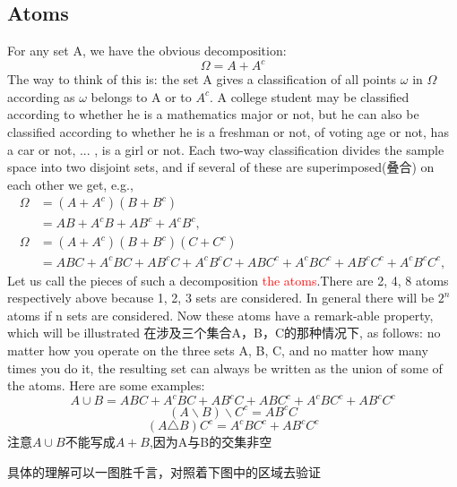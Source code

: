 \documentclass[12pt]{book}
\theoremstyle{definition}\newtheorem{dfn}{Définition}[chapter]
\theoremstyle{plain}\newtheorem{thm}{Théorème}[chapter]
\theoremstyle{plain}\newtheorem{prp}{Proposition}[chapter]
\theoremstyle{plain}\newtheorem{lem}{\bf Lemme}[chapter]
\theoremstyle{plain}\newtheorem{axm}{\bf Axiome}[chapter]
\theoremstyle{plain}\newtheorem{lmm}{\bf Lemme}[chapter]
\theoremstyle{plain}\newtheorem{exm}{\bf Example}[chapter]
\theoremstyle{plain}\newtheorem{cor}{\bf Corollaire}[chapter]
\theoremstyle{remark}\newtheorem{rem}{Remarque}[chapter]
\begin{document}
\subsection{Atoms}
For any set A, we have the obvious decomposition:
\begin{equation*}
\Omega=A+A^c
\end{equation*}
The way to think of this is: the set A gives a classiﬁcation of all points $\omega$ in $\Omega$ according as  $\omega$  belongs to A or to $A^c$. A college student may be classiﬁed according to whether he is a mathematics major or not, but he can also be classiﬁed according to whether he is a freshman or not, of voting age or not, has a car or not, ... , is a girl or not. Each two-way classiﬁcation divides the sample space into two disjoint sets, and if several of these are superimposed(叠合) on each other we get, e.g.,
$$\begin{aligned}
\Omega&=(A+A^c)(B+B^c)\\
&=AB+A^{c}B+AB^c+A^cB^c,\\
\Omega&=(A+A^c)(B+B^c)(C+C^c)\\
&=ABC+A^{c}BC+AB^cC+A^cB^cC+ABC^c+A^{c}BC^c+AB^cC^c+A^cB^cC^c,
\end{aligned}$$
Let us call the pieces of such a decomposition \textcolor{red}{the atoms}.There are 2, 4, 8 atoms respectively above because 1, 2, 3 sets are considered. In general there will be $2^n$ atoms if n sets are considered. Now these atoms have a remark-able property, which will be illustrated 在涉及三个集合A，B，C的那种情况下, as follows: no matter how you operate on the three sets A, B, C, and no matter how many times you do it, the resulting set can always be written as the union of some of the atoms. Here are some examples:
\begin{equation*}
A\cup B=ABC
+A^{c}BC+AB^cC+ABC^c
+A^{c}BC^c+AB^cC^c
\end{equation*}
\begin{equation*}
(A\backslash
B)\backslash C^c=AB^cC
\end{equation*}
\begin{equation*}
(A\triangle B)C^c=A^{c}BC^c+AB^cC^c
\end{equation*}
注意$A\cup B$不能写成$A+B$,因为A与B的交集非空

具体的理解可以一图胜千言，对照着下图中的区域去验证
\end{document}
